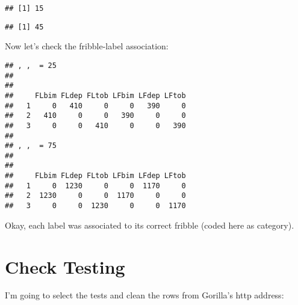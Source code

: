 \documentclass[
]{article}
\newenvironment{Shaded}{\begin{snugshade}}{\end{snugshade}}
\newcommand{\DecValTok}[1]{\textcolor[rgb]{0.00,0.00,0.81}{#1}}
\newcommand{\KeywordTok}[1]{\textcolor[rgb]{0.13,0.29,0.53}{\textbf{#1}}}
\newcommand{\NormalTok}[1]{#1}
\newcommand{\OperatorTok}[1]{\textcolor[rgb]{0.81,0.36,0.00}{\textbf{#1}}}
\newcommand{\StringTok}[1]{\textcolor[rgb]{0.31,0.60,0.02}{#1}}
\begin{document}
\begin{verbatim}
## [1] 15
\end{verbatim}

\begin{Shaded}
\end{Shaded}

\begin{verbatim}
## [1] 45
\end{verbatim}

Now let's check the fribble-label association:

\begin{Shaded}
\end{Shaded}

\begin{verbatim}
## , ,  = 25
## 
##    
##     FLbim FLdep FLtob LFbim LFdep LFtob
##   1     0   410     0     0   390     0
##   2   410     0     0   390     0     0
##   3     0     0   410     0     0   390
## 
## , ,  = 75
## 
##    
##     FLbim FLdep FLtob LFbim LFdep LFtob
##   1     0  1230     0     0  1170     0
##   2  1230     0     0  1170     0     0
##   3     0     0  1230     0     0  1170
\end{verbatim}

Okay, each label was associated to its correct fribble (coded here as
category).

\hypertarget{check-testing}{%
\section{Check Testing}\label{check-testing}}

I'm going to select the tests and clean the rows from Gorilla's http
address:
\end{document}
